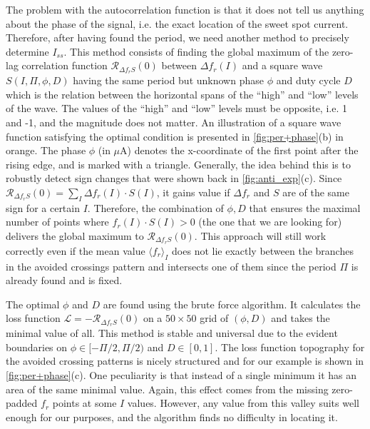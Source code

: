 \documentclass[%
 aip,
 draft,
 amsmath,amssymb,
 reprint,%
]{revtex4-1}
\begin{document}
The problem with the autocorrelation function is that it does not tell us anything about the phase of the signal, i.e. the exact location of the sweet spot current. Therefore, after having found the period, we need another method to precisely determine $I_{ss}$. This method consists of finding the global maximum of the zero-lag correlation function $\mathcal{R}_{\Delta f_r S}(0)$ between $\Delta f_r(I)$ and a square wave $S(I, \Pi, \phi, D)$ having the same period but unknown phase $\phi$ and duty cycle $D$ which is the relation between the horizontal spans of the ``high'' and ``low'' levels of the wave. 
The values of the ``high'' and ``low'' levels must be opposite, i.e. 1 and -1, and the magnitude does not matter.  An illustration of a square wave function satisfying the optimal condition is presented in \autoref{fig:per+phase}(b) in orange. The phase $\phi$ (in $\mu$A) denotes the x-coordinate of the first point after the rising edge, and is marked with a triangle. Generally, the idea behind this is to robustly detect sign changes that were shown back in \autoref{fig:anti_exp}(c). Since $\mathcal{R}_{\Delta f_r S}(0) = \sum_I \Delta f_r(I) \cdot S(I) $, it gains value if $\Delta f_r$ and $S$ are of the same sign for a certain $I$. Therefore, the combination of $\phi, D$ that ensures the maximal number of points where $f_r(I)\cdot S(I)>0$ (the one that we are looking for) delivers the global maximum to $\mathcal{R}_{\Delta f_r S}(0)$. This approach will still work correctly even if the mean value $\langle f_r \rangle_{I}$ does not lie exactly between the branches in the avoided crossings pattern and intersects one of them since the period $\Pi$ is already found and is fixed. 

The optimal $\phi$ and $D$ are found using the brute force algorithm. It calculates the loss function $\mathcal{L} = - \mathcal{R}_{\Delta f_r S}(0)$ on a $50 \times 50$ grid of $(\phi, D)$ and takes the minimal value of all. This method is stable and universal due to the evident boundaries on $\phi \in [-\Pi/2,\Pi/2)$ and $D \in [0, 1]$. The loss function topography for the avoided crossing patterns is nicely structured and for our example is shown in \autoref{fig:per+phase}(c). One peculiarity is that instead of a single minimum it has an area of the same minimal value. Again, this effect comes from the missing zero-padded $f_r$ points at some $I$ values. However, any value from this valley suits well enough for our purposes, and the algorithm finds no difficulty in locating it.
\end{document}
